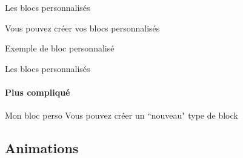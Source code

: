 \documentclass[french]{beamer}
\begin{document}
  \begin{frame}[fragile]{Les blocs personnalisés}
    \begin{remarque}
      Vous pouvez créer vos blocs personnalisés
      \begin{code}
        \newenvironment{remarque}
          {\begin{alertblock}{Remarque}}
          {\end{alertblock}}
      \end{code}
    \end{remarque}
    \begin{essai}
      Exemple de bloc personnalisé
      \begin{code}
        \newenvironment{essai}
          {\begin{exampleblock}{Essai}}
          {\end{exampleblock}}
      \end{code}
    \end{essai}
  \end{frame}
  
  \begin{frame}[fragile]{Les blocs personnalisés}
    \framesubtitle{Plus compliqué}
    \begin{attention}{Mon bloc perso}
      Vous pouvez créer un ``nouveau" type de block
      \begin{code}
        \newenvironment{attention}[1]
          {\begin{block}{#1}}
          {\end{block}}
          
      \end{code}
    \end{attention}
  \end{frame}
  
  \subsection{Animations}
  
\end{document}
